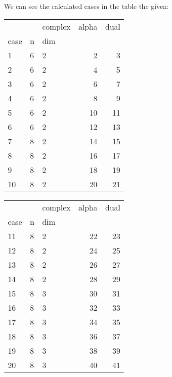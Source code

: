 \documentclass{article}
\begin{document}
\par We can see the calculated cases in the table the given:
\begin{center}
\begin{tabular}{lllrr}
\toprule
&  & complex & alpha & dual \\
case & n & dim &  &  \\
\midrule
1 & 6 & 2 & 2 & 3 \\
\cline{1-5} \cline{2-5}
2 & 6 & 2 & 4 & 5 \\
\cline{1-5} \cline{2-5}
3 & 6 & 2 & 6 & 7 \\
\cline{1-5} \cline{2-5}
4 & 6 & 2 & 8 & 9 \\
\cline{1-5} \cline{2-5}
5 & 6 & 2 & 10 & 11 \\
\cline{1-5} \cline{2-5}
6 & 6 & 2 & 12 & 13 \\
\cline{1-5} \cline{2-5}
7 & 8 & 2 & 14 & 15 \\
\cline{1-5} \cline{2-5}
8 & 8 & 2 & 16 & 17 \\
\cline{1-5} \cline{2-5}
9 & 8 & 2 & 18 & 19 \\
\cline{1-5} \cline{2-5}
10 & 8 & 2 & 20 & 21 \\
\cline{1-5} \cline{2-5}
\bottomrule
\end{tabular}
\begin{tabular}{lllrr}
\toprule
&  & complex & alpha & dual \\
case & n & dim &  &  \\
\midrule
11 & 8 & 2 & 22 & 23 \\
\cline{1-5} \cline{2-5}
12 & 8 & 2 & 24 & 25 \\
\cline{1-5} \cline{2-5}
13 & 8 & 2 & 26 & 27 \\
\cline{1-5} \cline{2-5}
14 & 8 & 2 & 28 & 29 \\
\cline{1-5} \cline{2-5}
15 & 8 & 3 & 30 & 31 \\
\cline{1-5} \cline{2-5}
16 & 8 & 3 & 32 & 33 \\
\cline{1-5} \cline{2-5}
17 & 8 & 3 & 34 & 35 \\
\cline{1-5} \cline{2-5}
18 & 8 & 3 & 36 & 37 \\
\cline{1-5} \cline{2-5}
19 & 8 & 3 & 38 & 39 \\
\cline{1-5} \cline{2-5}
20 & 8 & 3 & 40 & 41 \\
\cline{1-5} \cline{2-5}
\bottomrule
\end{tabular}

\end{center}
\end{document}
